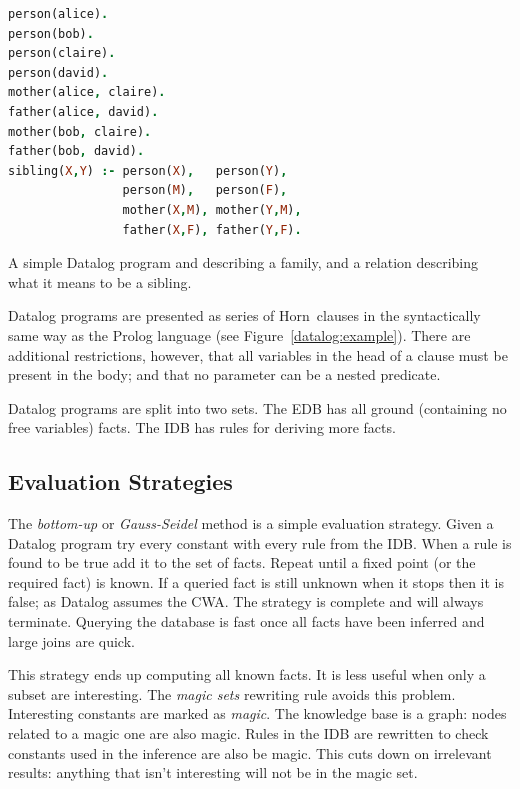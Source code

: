 \documentclass[a4paper,sfsidenotes]{tufte-book}
\begin{document}
\begin{marginfigure}
  \label{datalog:example}
  \begin{lstlisting}[language=Prolog]
person(alice).  
person(bob).
person(claire). 
person(david).
mother(alice, claire).
father(alice, david).
mother(bob, claire).
father(bob, david).
sibling(X,Y) :- person(X),   person(Y),
                person(M),   person(F),
                mother(X,M), mother(Y,M), 
                father(X,F), father(Y,F).
  \end{lstlisting}
  \caption{A simple Datalog program and describing a family, and a relation
  describing what it means to be a sibling.}
\end{marginfigure}

Datalog programs are presented as series of Horn~clauses in the syntactically
same way as the Prolog language (see Figure~\ref{datalog:example}).  There are
additional restrictions, however, that all variables in the head of a clause
must be present in the body; and that no parameter can be a nested predicate.

Datalog programs are split into two sets.
The \ac{EDB} has all ground (containing no free variables) facts.
The \ac{IDB} has rules for deriving more facts.

\subsection{Evaluation Strategies}

The \emph{bottom-up} or \emph{Gauss-Seidel} method is a simple evaluation
strategy\cite{Ceri:1989ff}.  Given a Datalog program try every constant with
every rule from the \ac{IDB}.  When a rule is found to be true add it to the set
of facts.  Repeat until a fixed point (or the required fact) is known.  If a
queried fact is still unknown when it stops then it is false; as Datalog assumes
the \ac{CWA}.  The strategy is complete and will always
terminate. Querying the database is fast once all facts have been inferred 
and large joins are quick.

This strategy ends up computing all known facts. It is less useful when only a
subset are interesting.  The \emph{magic sets}\cite{Bancilhon:1985cz} rewriting
rule avoids this problem.  Interesting constants are marked as \emph{magic}. The
knowledge base is a graph: nodes related to a magic one are also magic.  Rules
in the \ac{IDB} are rewritten to check constants used in the inference are also
be magic.  This cuts down on irrelevant results: anything that isn't
interesting will not be in the magic set.
\end{document}
